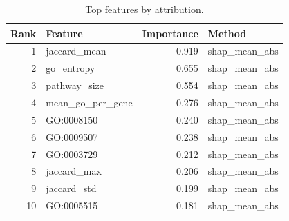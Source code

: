 \begin{table}[htbp]
\centering
\caption{Top features by attribution.}
\label{tab:top_features_recomputed}
\begin{tabular}{rlrl}
\toprule
Rank & Feature & Importance & Method \\
\midrule
1 & jaccard\_mean & 0.919 & shap\_mean\_abs \\
2 & go\_entropy & 0.655 & shap\_mean\_abs \\
3 & pathway\_size & 0.554 & shap\_mean\_abs \\
4 & mean\_go\_per\_gene & 0.276 & shap\_mean\_abs \\
5 & GO:0008150 & 0.240 & shap\_mean\_abs \\
6 & GO:0009507 & 0.238 & shap\_mean\_abs \\
7 & GO:0003729 & 0.212 & shap\_mean\_abs \\
8 & jaccard\_max & 0.206 & shap\_mean\_abs \\
9 & jaccard\_std & 0.199 & shap\_mean\_abs \\
10 & GO:0005515 & 0.181 & shap\_mean\_abs \\
\bottomrule
\end{tabular}

\end{table}
